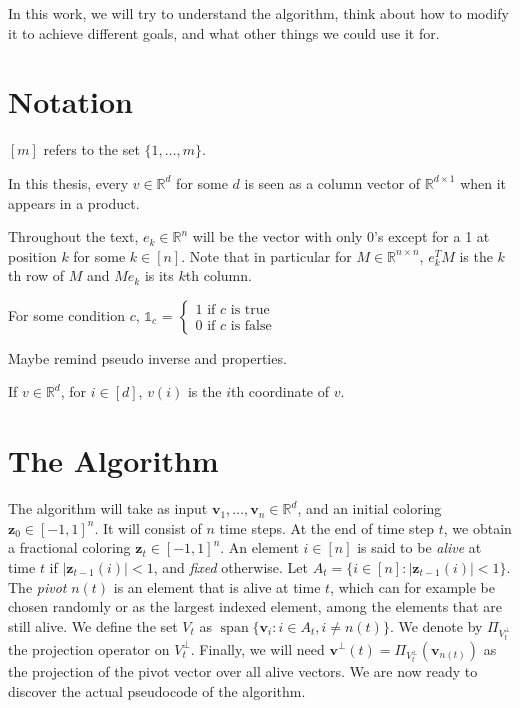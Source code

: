 \documentclass[12pt]{article}
\DeclareMathOperator{\Span}{span}
\begin{document}
In this work, we will try to understand the algorithm, think about how to modify it to achieve different goals, and what other things we could use it for.

\section{Notation}
$[m]$ refers to the set $\{1,\dots,m\}$.

In this thesis, every $v\in\mathbb{R}^d$ for some $d$ is seen as a column vector of $\mathbb{R}^{d\times 1}$ when it appears in a product.

Throughout the text, $e_k\in\mathbb{R}^{n}$ will be the vector with only 0's except for a 1 at position $k$ for some $k\in[n]$. Note that in particular for $M\in\mathbb{R}^{n\times n}$, $e_k^TM$ is the $k$th row of $M$ and $Me_k$ is its $k$th column.

For some condition $c$, $\mathds{1}_{c}$ = $\begin{cases}
            1 \textrm{ if }c\textrm{ is true}\\
            0 \textrm{ if }c\textrm{ is false}
        \end{cases}$

Maybe remind pseudo inverse and properties.

If $v\in\mathbb{R}^d$, for $i\in[d]$, $v(i)$ is the $i$th coordinate of $v$.

\section{The Algorithm}
The algorithm will take as input $\textbf{v}_1,\ldots,\textbf{v}_n\in\mathbb{R}^d$, and an initial coloring $\textbf{z}_0\in[-1,1]^n$. It will consist of $n$ time steps. At the end of time step $t$, we obtain a fractional coloring $\textbf{z}_t\in[-1,1]^n$. An element $i \in [n]$ is said to be \textit{alive} at time $t$ if $|\textbf{z}_{t-1}(i)|<1$, and \textit{fixed} otherwise. Let $A_t=\{i\in[n]:|\textbf{z}_{t-1}(i)|<1\}$. The \textit{pivot} $n(t)$ is an element that is alive at time $t$, which can for example be chosen randomly or as the largest indexed element, among the elements that are still alive. We define the set $V_t$ as $\Span\{\textbf{v}_i:i\in A_t,i\not=n(t)\}$. We denote by $\Pi_{V_t^\perp}$ the projection operator on $V_t^\perp$. Finally, we will need $\textbf{v}^{\perp}(t)=\Pi_{V_t^\perp}(\textbf{v}_{n(t)})$ as the projection of the pivot vector over all alive vectors. We are now ready to discover the actual pseudocode of the algorithm.
\end{document}
